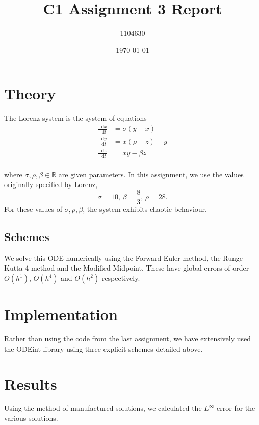 \documentclass[letterpaper,12pt]{article}
\newcommand{\R}{\ensuremath{\mathbb{R}}}
\newcommand*{\diff}{\mathop{}\!\mathrm{d}}
\begin{document}
\title{C1 Assignment 3 Report}
\author{1104630}
\date{\today}
\maketitle

\begin{abstract}

\end{abstract}


\section{Theory}

The Lorenz system is the system of equations
\begin{align*}
\frac{\diff x}{\diff t} &= \sigma(y - x) \\
\frac{\diff y}{\diff t} &= x(\rho - z) - y \\
\frac{\diff z}{\diff t} &= xy -\beta z \\
\end{align*}

where $ \sigma, \rho, \beta \in \R $ are given parameters. In this assignment, we use the values originally specified by Lorenz,
\[
\sigma = 10 \text{,   } \beta = \frac{8}{3} \text{,   } \rho = 28.
\]
For these values of $ \sigma, \rho, \beta$, the system exhibits chaotic behaviour.

\subsection{Schemes}

We solve this ODE numerically using the Forward Euler method, the Runge-Kutta 4 method and the Modified Midpoint. These have global errors of order $O(h^1)$, $O(h^4)$ and $O(h^2)$ respectively.

\section{Implementation}

Rather than using the code from the last assignment, we have extensively used the ODEint library using three explicit schemes detailed above.

\section{Results}

Using the method of manufactured solutions, we calculated the $L^{\infty}$-error for the various solutions.
\end{document}
